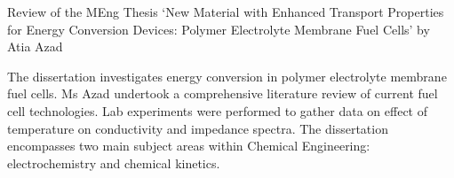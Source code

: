 \documentclass[14pt,twoside]{report}
\begin{document}
\clearpage




\bigskip

\begin{center}
  {\Large Review of the MEng Thesis `New Material with Enhanced Transport Properties for Energy Conversion Devices: Polymer Electrolyte Membrane Fuel Cells' by Atia Azad}
\end{center}
The dissertation investigates energy conversion in polymer electrolyte membrane fuel cells. Ms Azad undertook a comprehensive literature review of current fuel cell technologies. Lab experiments were performed to gather data on effect of temperature on conductivity and impedance spectra. The dissertation encompasses two main subject areas within Chemical Engineering: electrochemistry and chemical kinetics. 
\end{document}
